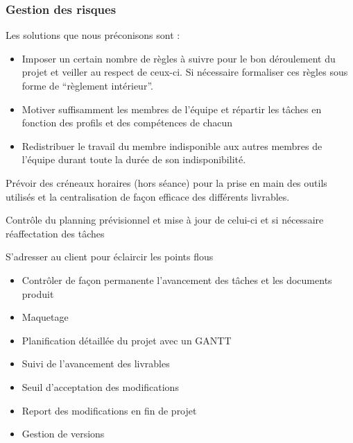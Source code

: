 \subsubsection{Gestion des risques}

\setcounter{solutions}{0}

\newcommand{\solution}[1]{
    \addtocounter{solutions}{1}
    \item[S\thesolutions]{\indent#1}
}

Les solutions que nous préconisons sont :
\begin{description}
    \solution{
        \begin{itemize}
            \item Imposer un certain nombre de règles à suivre pour le bon déroulement du projet et veiller au respect de ceux-ci. Si nécessaire formaliser ces règles sous forme de “règlement intérieur”.
            \item Motiver suffisamment les membres de l’équipe  et répartir les tâches en fonction des profils et des compétences de chacun
            \item Redistribuer le travail du membre indisponible aux autres membres de l’équipe durant toute la durée de son indisponibilité.
        \end{itemize}}
    \solution{
        Prévoir des créneaux horaires (hors séance) pour la prise en main des outils utilisés  et la centralisation de façon efficace des différents livrables.}

    \solution{
        Contrôle du planning prévisionnel et mise à jour de celui-ci et si nécessaire réaffectation des tâches}
    \solution{
        S’adresser au client pour éclaircir les points flous}
    \solution{
        \begin{itemize}
            \item Contrôler de façon permanente l’avancement des tâches et les documents produit
            \item Maquetage
        \end{itemize}}
    \solution{
        \begin{itemize}
            \item Planification détaillée du projet avec un GANTT
            \item Suivi de l’avancement des livrables
        \end{itemize}}
    \solution{
        \begin{itemize}
            \item Seuil d’acceptation des modifications
            \item Report des modifications en fin de projet
            \item Gestion de versions
        \end{itemize}}
\end{description}
